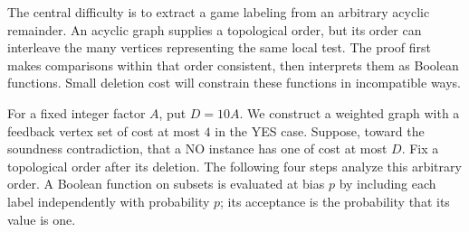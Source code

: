 The central difficulty is to extract a game labeling from an arbitrary
acyclic remainder. An acyclic graph supplies a topological order, but
its order can interleave the many vertices representing the same local
test. The proof first makes comparisons within that order consistent,
then interprets them as Boolean functions. Small deletion cost will
constrain these functions in incompatible ways.

For a fixed integer factor $A$, put $D=10A$. We construct a weighted
graph with a feedback vertex set of cost at most $4$ in the YES case.
Suppose, toward the soundness contradiction, that a NO instance has
one of cost at most $D$. Fix a topological order after its deletion.
The following four steps analyze this arbitrary order. A Boolean
function on subsets is evaluated at bias $p$ by including each label
independently with probability $p$; its acceptance is the probability
that its value is one.

